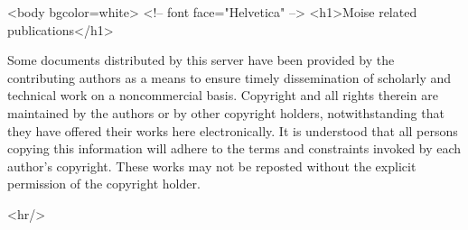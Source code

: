 \documentclass{article}
\begin{document}
\begin{rawhtml}
<body bgcolor=white>
<!-- font face="Helvetica" -->
<h1>Moise related publications</h1>
\end{rawhtml}

\tableofcontents

Some documents distributed by this server have been provided by the
contributing authors as a means to ensure timely dissemination of
scholarly and technical work on a noncommercial basis.  Copyright and
all rights therein are maintained by the authors or by other copyright
holders, notwithstanding that they have offered their works here
electronically. It is understood that all persons copying this
information will adhere to the terms and constraints invoked by each
author's copyright. These works may not be reposted without the
explicit permission of the copyright holder.
































\begin{rawhtml}
<hr/>
\end{rawhtml}
\end{document}
